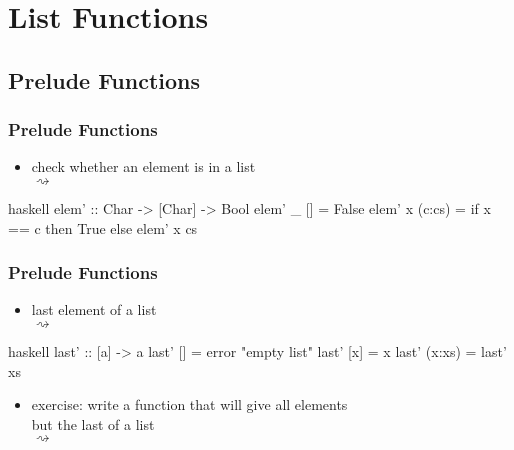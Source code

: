 \documentclass[dvipsnames]{beamer}
\theoremstyle{plain}
\begin{document}
\section{List Functions}

\subsection{Prelude Functions}

\begin{frame}[fragile]
  \frametitle{Prelude Functions}

  \begin{itemize}
    \item check whether an element is in a list\\
       $\rightsquigarrow$
  \end{itemize}

  \begin{exampleblock}{}
    \begin{pygments}{haskell}
elem' :: Char -> [Char] -> Bool
elem' _ [] = False
elem' x (c:cs) = if x == c then True else elem' x cs
    \end{pygments}
  \end{exampleblock}
\end{frame}

\begin{frame}[fragile]
  \frametitle{Prelude Functions}

  \begin{itemize}
    \item last element of a list\\
       $\rightsquigarrow$
  \end{itemize}

  \begin{exampleblock}{}
    \begin{pygments}{haskell}
last' :: [a] -> a
last' [] = error "empty list"
last' [x] = x
last' (x:xs) = last' xs
    \end{pygments}
  \end{exampleblock}

  \pause
  \begin{itemize}
    \item exercise: write a function that will give all elements\\
      but the last of a list\\
       $\rightsquigarrow$
  \end{itemize}
\end{frame}
\end{document}
